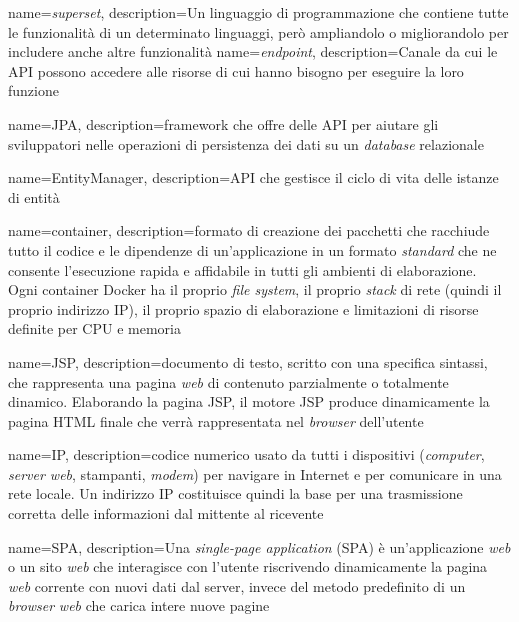 {
    name=\textit{superset},
    description={Un linguaggio di programmazione che contiene tutte le funzionalità di un determinato linguaggi, però ampliandolo o migliorandolo per includere anche altre funzionalità}
}
{
    name=\textit{endpoint},
    description={Canale da cui le \gls{API} possono accedere alle risorse di cui hanno bisogno per eseguire la loro funzione}
}

{
    name=JPA,
    description={\gls{framework} che offre delle \gls{API} per aiutare gli sviluppatori nelle operazioni di persistenza dei dati su un \textit{database} relazionale}
}


{
    name=EntityManager,
    description={API che gestisce il ciclo di vita delle istanze di entità}
}

{
    name=container,
    description={formato di creazione dei pacchetti che racchiude tutto il codice e le dipendenze di un'applicazione in un formato \textit{standard} che ne consente l'esecuzione rapida e affidabile in tutti gli ambienti di elaborazione.\\ Ogni container Docker ha il proprio \textit{file system}, il proprio \textit{stack} di rete (quindi il proprio indirizzo \gls{IP}), il proprio spazio di elaborazione e limitazioni di risorse definite per CPU e memoria}
}

{
    name=JSP,
    description={documento di testo, scritto con una specifica sintassi, che rappresenta una pagina \textit{web} di contenuto parzialmente o totalmente dinamico. Elaborando la pagina JSP, il motore JSP produce dinamicamente la pagina HTML finale che verrà rappresentata nel \textit{browser} dell'utente}
}

{
    name=IP,
    description={codice numerico usato da tutti i dispositivi (\textit{computer}, \textit{server web}, stampanti, \textit{modem}) per navigare in Internet e per comunicare in una rete locale. Un indirizzo IP costituisce quindi la base per una trasmissione corretta delle informazioni dal mittente al ricevente}
}

{
    name=SPA,
    description={Una \textit{single-page application} (SPA) è un'applicazione \textit{web} o un sito \textit{web} che interagisce con l'utente riscrivendo dinamicamente la pagina \textit{web} corrente con nuovi dati dal server, invece del metodo predefinito di un \textit{browser} \textit{web} che carica intere nuove pagine}
}

